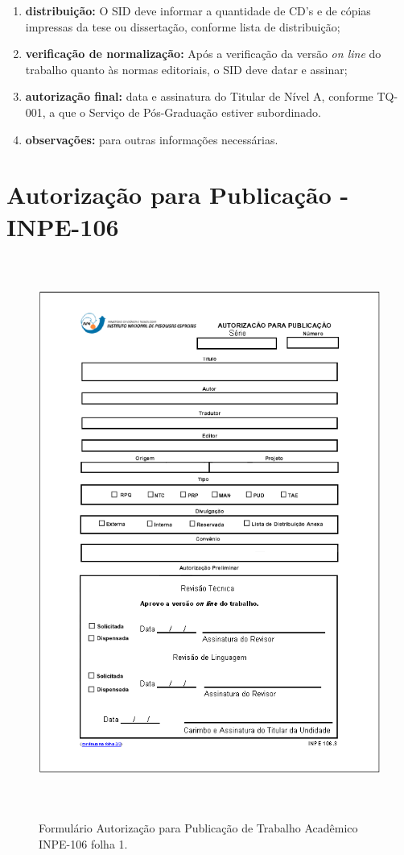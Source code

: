 \begin{enumerate}
 \item \textbf{distribuição:} O SID deve informar a quantidade de CD's e de cópias impressas da tese ou dissertação, conforme lista de distribuição;
 
 \item \textbf{verificação de normalização:}  Após a verificação da versão \emph{on line} do trabalho quanto às normas editoriais, o SID deve datar e assinar;
 
 \item \textbf{autorização final:} data e assinatura do Titular de Nível A, conforme TQ-001, a que o Serviço de Pós-Graduação estiver subordinado.
 
 \item \textbf{observações:} para outras informações necessárias. 

\end{enumerate}

\section{Autorização para Publicação - INPE-106}
\begin{figure}[ht!]
	\caption{Formulário Autorização para Publicação de Trabalho Acadêmico INPE-106 folha 1.} 
	\vspace{6mm}	%
	\centering
	\includegraphics[height=18cm]{./Figuras/form106.png}
	\label{form106}
\end{figure}

